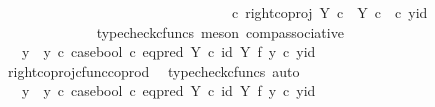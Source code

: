 \begin{isabellebody}
\ \ \ \ \ \ \ \ \ \ \ \ \ \ \ \ \ \ \ \ \ \ \ \ \ \ \ \ \ \ \ \ \ {\isasymcirc}\isactrlsub c\ right{\isacharunderscore}{\kern0pt}coproj\ {\isacharparenleft}{\kern0pt}Y\ {\isasymtimes}\isactrlsub c\ {\isasymone}{\isacharparenright}{\kern0pt}\ {\isacharparenleft}{\kern0pt}Y\ {\isasymtimes}\isactrlsub c\ {\isasymone}{\isacharparenright}{\kern0pt}{\isacharparenright}{\kern0pt}\ {\isasymcirc}\isactrlsub c\ {\isasymlangle}y{\isacharcomma}{\kern0pt}id\ {\isasymone}{\isasymrangle}{\isachardoublequoteclose}\isanewline
\ \ \ \ \ \ \ \ \ \ \ \ \isamarkupfalse%
\ {\isacharparenleft}{\kern0pt}typecheck{\isacharunderscore}{\kern0pt}cfuncs{\isacharcomma}{\kern0pt}\ meson\ comp{\isacharunderscore}{\kern0pt}associative{}{\isacharparenright}{\kern0pt}\isanewline
\ \ \ \ \ \ \ \ \ \ \isamarkupfalse%
\ \isamarkupfalse%
\ {\isachardoublequoteopen}{\isachardot}{\kern0pt}{\isachardot}{\kern0pt}{\isachardot}{\kern0pt}\ {\isacharequal}{\kern0pt}\ {\isacharparenleft}{\kern0pt}{\isacharparenleft}{\kern0pt}y{}\ {\isasymamalg}\ y{}{\isacharparenright}{\kern0pt}\ {\isasymcirc}\isactrlsub c\ case{\isacharunderscore}{\kern0pt}bool\ {\isasymcirc}\isactrlsub c\ eq{\isacharunderscore}{\kern0pt}pred\ Y\ {\isasymcirc}\isactrlsub c\ {\isacharparenleft}{\kern0pt}id\ Y\ {\isasymtimes}\isactrlsub f\ y{}{\isacharparenright}{\kern0pt}{\isacharparenright}{\kern0pt}\ {\isasymcirc}\isactrlsub c\ {\isasymlangle}y{\isacharcomma}{\kern0pt}id\ {\isasymone}{\isasymrangle}{\isachardoublequoteclose}\isanewline
\ \ \ \ \ \ \ \ \ \ \ \ \isamarkupfalse%
\ right{\isacharunderscore}{\kern0pt}coproj{\isacharunderscore}{\kern0pt}cfunc{\isacharunderscore}{\kern0pt}coprod\ \isamarkupfalse%
\ {\isacharparenleft}{\kern0pt}typecheck{\isacharunderscore}{\kern0pt}cfuncs{\isacharcomma}{\kern0pt}\ auto{\isacharparenright}{\kern0pt}\isanewline
\ \ \ \ \ \ \ \ \ \ \isamarkupfalse%
\ \isamarkupfalse%
\ {\isachardoublequoteopen}{\isachardot}{\kern0pt}{\isachardot}{\kern0pt}{\isachardot}{\kern0pt}\ {\isacharequal}{\kern0pt}\ {\isacharparenleft}{\kern0pt}y{}\ {\isasymamalg}\ y{}{\isacharparenright}{\kern0pt}\ {\isasymcirc}\isactrlsub c\ case{\isacharunderscore}{\kern0pt}bool\ {\isasymcirc}\isactrlsub c\ eq{\isacharunderscore}{\kern0pt}pred\ Y\ {\isasymcirc}\isactrlsub c\ {\isacharparenleft}{\kern0pt}id\ Y\ {\isasymtimes}\isactrlsub f\ y{}{\isacharparenright}{\kern0pt}\ {\isasymcirc}\isactrlsub c\ {\isasymlangle}y{\isacharcomma}{\kern0pt}id\ {\isasymone}{\isasymrangle}{\isachardoublequoteclose}\isanewline

\end{isabellebody}

